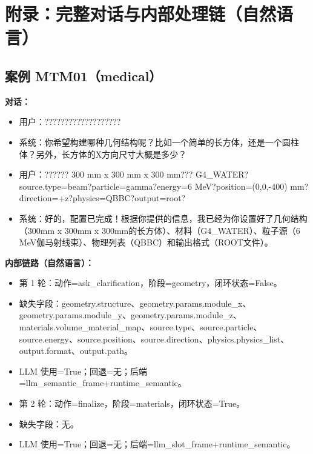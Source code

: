 \documentclass[11pt]{ctexart}
\begin{document}
\section{附录：完整对话与内部处理链（自然语言）}
\subsection{案例 MTM01（medical）}
\textbf{对话：}
\begin{itemize}
\item 用户：???????????????????
\item 系统：你希望构建哪种几何结构呢？比如一个简单的长方体，还是一个圆柱体？另外，长方体的X方向尺寸大概是多少？
\item 用户：?????? 300 mm x 300 mm x 300 mm??? G4\_WATER?source.type=beam?particle=gamma?energy=6 MeV?position=(0,0,-400) mm?direction=+z?physics=QBBC?output=root?
\item 系统：好的，配置已完成！根据你提供的信息，我已经为你设置好了几何结构（300mm x 300mm x 300mm的长方体）、材料（G4\_WATER）、粒子源（6 MeV伽马射线束）、物理列表（QBBC）和输出格式（ROOT文件）。
\end{itemize}
\textbf{内部链路（自然语言）：}
\begin{itemize}
\item 第 1 轮：动作=ask\_clarification，阶段=geometry，闭环状态=False。
\item 缺失字段：geometry.structure、geometry.params.module\_x、geometry.params.module\_y、geometry.params.module\_z、materials.volume\_material\_map、source.type、source.particle、source.energy、source.position、source.direction、physics.physics\_list、output.format、output.path。
\item LLM 使用=True；回退=无；后端=llm\_semantic\_frame+runtime\_semantic。
\item 第 2 轮：动作=finalize，阶段=materials，闭环状态=True。
\item 缺失字段：无。
\item LLM 使用=True；回退=无；后端=llm\_slot\_frame+runtime\_semantic。
\end{itemize}
\end{document}
